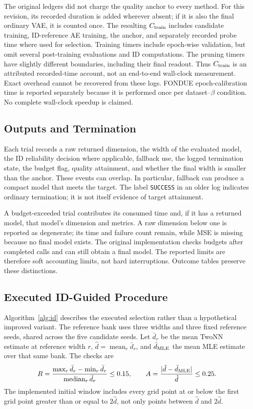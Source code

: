 The original ledgers did not charge the quality anchor to every method.
For this revision, its recorded duration is added wherever absent; if it
is also the final ordinary VAE, it is counted once. The resulting
$C_{\rm train}$ includes candidate training, ID-reference AE training,
the anchor, and separately recorded probe time where used for selection.
Training timers include epoch-wise validation, but omit several
post-training evaluations and ID computations. The pruning timers have
slightly different boundaries, including their final readout. Thus
$C_{\rm train}$ is an attributed recorded-time account, not an end-to-end
wall-clock measurement. Exact overhead cannot be recovered from these
logs. FONDUE epoch-calibration time is reported separately because it is
performed once per dataset--$\beta$ condition. No complete wall-clock
speedup is claimed.

\subsection{Outputs and Termination}\label{sec:outcomes}
Each trial records a raw returned dimension, the width of the evaluated
model, the ID reliability decision where applicable, fallback use, the
logged termination state, the budget flag, quality attainment, and whether
the final width is smaller than the anchor. These events can overlap.
In particular, fallback can produce a compact model that meets the target.
The label \texttt{SUCCESS} in an older log indicates ordinary termination;
it is not itself evidence of target attainment.

A budget-exceeded trial contributes its consumed time and, if it has a
returned model, that model's dimension and metrics. A raw dimension below
one is reported as degenerate; its time and failure count remain, while
MSE is missing because no final model exists. The original implementation
checks budgets after completed calls and can still obtain a final model.
The reported limits are therefore soft accounting limits, not hard
interruptions. Outcome tables preserve these distinctions.

\subsection{Executed ID-Guided Procedure}\label{sec:algorithm}
Algorithm~\ref{alg:id} describes the executed selection rather than a
hypothetical improved variant. The reference bank uses three widths and
three fixed reference seeds, shared across the five candidate seeds.
Let $\bar d_r$ be the mean TwoNN estimate at reference width $r$,
$\hat d=\operatorname{mean}_r\bar d_r$, and $\bar d_{\rm MLE}$ the mean
MLE estimate over that same bank. The checks are
\begin{equation}
 R=\frac{\max_r\bar d_r-\min_r\bar d_r}{\operatorname{median}_r\bar d_r}
 \le0.15,\qquad
 A=\frac{|\hat d-\bar d_{\rm MLE}|}{\hat d}\le0.25.
 \label{eq:checks}
\end{equation}
The implemented initial window includes every grid point at or below the
first grid point greater than or equal to $2\hat d$, not only points
between $\hat d$ and $2\hat d$.

